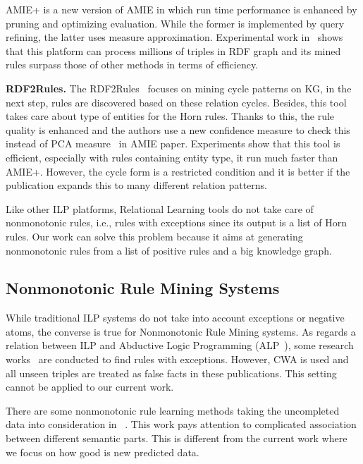 AMIE+ is a new version of AMIE in which run time performance is enhanced by pruning and optimizing evaluation. While the former is implemented by query refining, the latter uses measure approximation. Experimental work in~\cite{ref10} shows that this platform can process millions of triples in RDF graph and its mined rules surpass those of other methods in terms of efficiency.

\textbf{RDF2Rules.} The RDF2Rules~\cite{ref29} focuses on mining cycle patterns on KG, in the next step, rules are discovered based on these relation cycles. Besides, this tool takes care about type of entities for the Horn rules. Thanks to this, the rule quality is enhanced and the authors use a new confidence measure to check this instead of PCA measure~\cite{ref10} in AMIE paper. Experiments show that this tool is efficient, especially with rules containing entity type, it run much faster than AMIE+. However, the cycle form is a restricted condition and it is better if the publication expands this to many different relation patterns.

Like other ILP platforms, Relational Learning tools do not take care of nonmonotonic rules, i.e., rules with exceptions since its output is a list of Horn rules. Our work can solve this problem because it aims at generating nonmonotonic rules from a list of positive rules and a big knowledge graph.

\subsection{Nonmonotonic Rule Mining Systems}
\label{related-work-nonmonotonic-rule-mining-systems}

While traditional ILP systems do not take into account exceptions or negative atoms, the converse is true for Nonmonotonic Rule Mining systems. As regards a relation between ILP and Abductive Logic Programming (ALP~\cite{ref31}), some research works~\cite{ref11, ref32, ref33} are conducted to find rules with exceptions. However, CWA is used and all unseen triples are treated as false facts in these publications. This setting cannot be applied to our current work.

There are some nonmonotonic rule learning methods taking the uncompleted data into consideration in ~\cite{ref34}. This work pays attention to complicated association between different semantic parts. This is different from the current work where we focus on how good is new predicted data.

